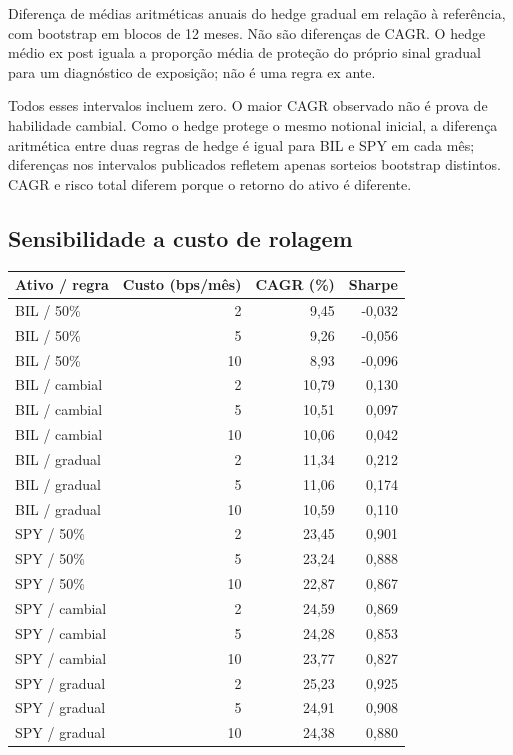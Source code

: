 \documentclass[11pt,a4paper]{article}
\begin{document}
Diferença de médias aritméticas anuais do hedge gradual em relação à referência, com bootstrap em blocos de 12 meses. Não são diferenças de CAGR. O hedge médio ex post iguala a proporção média de proteção do próprio sinal gradual para um diagnóstico de exposição; não é uma regra ex ante.

Todos esses intervalos incluem zero. O maior CAGR observado não é prova de habilidade cambial. Como o hedge protege o mesmo notional inicial, a diferença aritmética entre duas regras de hedge é igual para BIL e SPY em cada mês; diferenças nos intervalos publicados refletem apenas sorteios bootstrap distintos. CAGR e risco total diferem porque o retorno do ativo é diferente.
\subsection*{Sensibilidade a custo de rolagem}
\footnotesize\begin{center}\begin{tabular}{lrrr}\toprule
Ativo / regra & Custo (bps/mês) & CAGR (\%) & Sharpe \\ \midrule
BIL / 50\% & 2 & 9,45 & -0,032 \\
BIL / 50\% & 5 & 9,26 & -0,056 \\
BIL / 50\% & 10 & 8,93 & -0,096 \\
BIL / cambial & 2 & 10,79 & 0,130 \\
BIL / cambial & 5 & 10,51 & 0,097 \\
BIL / cambial & 10 & 10,06 & 0,042 \\
BIL / gradual & 2 & 11,34 & 0,212 \\
BIL / gradual & 5 & 11,06 & 0,174 \\
BIL / gradual & 10 & 10,59 & 0,110 \\
SPY / 50\% & 2 & 23,45 & 0,901 \\
SPY / 50\% & 5 & 23,24 & 0,888 \\
SPY / 50\% & 10 & 22,87 & 0,867 \\
SPY / cambial & 2 & 24,59 & 0,869 \\
SPY / cambial & 5 & 24,28 & 0,853 \\
SPY / cambial & 10 & 23,77 & 0,827 \\
SPY / gradual & 2 & 25,23 & 0,925 \\
SPY / gradual & 5 & 24,91 & 0,908 \\
SPY / gradual & 10 & 24,38 & 0,880 \\
\bottomrule\end{tabular}\end{center}\normalsize
\end{document}
